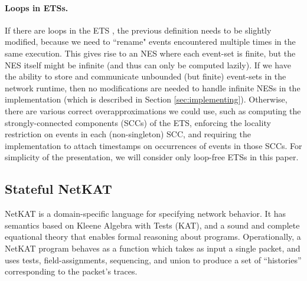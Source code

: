 \documentclass[pldi-cameraready]{sigplanconf}
\begin{document}
\paragraph{Loops in ETSs.}
If there are loops in the ETS , the previous definition needs to be
slightly modified, because we need to ``rename" events encountered
multiple times in the same execution. This gives rise to an NES where
each event-set is finite, but the NES itself might be infinite (and
thus can only be computed lazily). If we have the ability to
store and communicate unbounded (but finite) event-sets in the network
runtime, then no modifications are needed to handle infinite NESs in
the implementation (which is described in Section \ref{sec:implementing}).
Otherwise, there are various correct overapproximations we could use,
such as computing the
strongly-connected components (SCCs) of the ETS, enforcing the
locality restriction on events in each (non-singleton) SCC, and
requiring the implementation to attach timestamps on occurrences of
events in those SCCs. For simplicity of the presentation, we will consider only loop-free ETSs
in this paper.








\subsection{Stateful NetKAT}

NetKAT \cite{anderson2014netkat} is a domain-specific language for
specifying network behavior. It has semantics based on Kleene
Algebra with Tests (KAT), and a sound and complete equational theory
that enables formal reasoning about programs. Operationally, a NetKAT
program behaves as a function which takes as input a single packet,
and uses tests, field-assignments, sequencing, and union to produce a
set of ``histories'' corresponding to the packet's traces.
\end{document}
